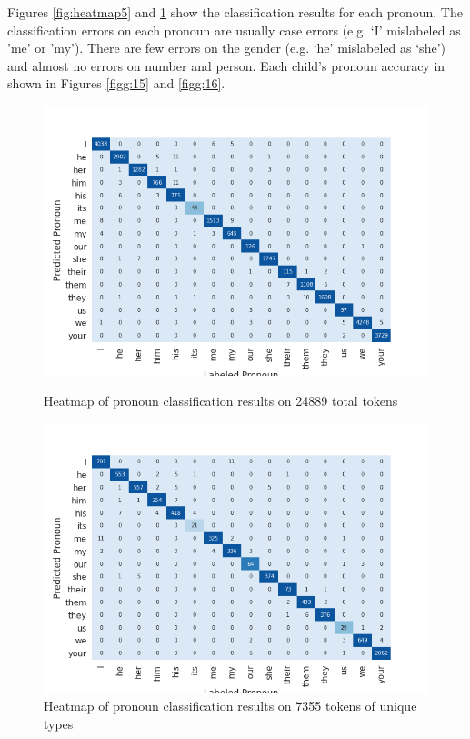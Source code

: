 Figures \ref{fig:heatmap5} and \ref{fig:heatmap6} show the classification results for each pronoun. The classification errors on each pronoun are usually case errors (e.g. `I' mislabeled as 'me' or 'my'). There are few errors on the gender (e.g. `he' mislabeled as `she') and almost no errors on number and person. Each child's pronoun accuracy in shown in Figures \ref{figg:15} and \ref{figg:16}. 
\FloatBarrier
\begin{figure}[!h]
    \centering
    \includegraphics[scale = 0.55]{graph/aXbheatmap24889pronoun.png}
    \caption{Heatmap of pronoun classification results on 24889 total tokens}
    \label{fig:heatmap5}
    \includegraphics[scale = 0.55]{graph/aXbheatmap7355pronoun.png}
    \caption{Heatmap of pronoun classification results on 7355 tokens of unique types}
    \label{fig:heatmap6}
\end{figure}
\FloatBarrier

